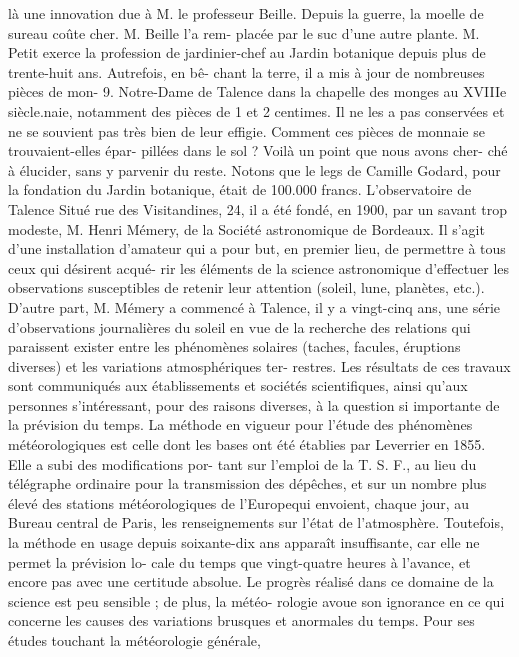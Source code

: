 \documentclass[a4paper,11pt]{book}
\begin{document}
là une innovation due à M. le professeur Beille. Depuis la
guerre, la moelle de sureau coûte cher. M. Beille l'a rem-
placée par le suc d'une autre plante.
M. Petit exerce la profession de jardinier-chef au Jardin
botanique depuis plus de trente-huit ans. Autrefois, en bê-
chant la terre, il a mis à jour de nombreuses pièces de mon-
9. Notre-Dame de Talence dans la chapelle des monges au XVIIIe siècle.naie, notamment des pièces de 1 et 2 centimes. Il ne les a
pas conservées et ne se souvient pas très bien de leur effigie.
Comment ces pièces de monnaie se trouvaient-elles épar-
pillées dans le sol ? Voilà un point que nous avons cher-
ché à élucider, sans y parvenir du reste.
Notons que le legs de Camille Godard, pour la fondation
du Jardin botanique, était de 100.000 francs.
L'observatoire de Talence
Situé rue des Visitandines, 24, il a été fondé, en 1900, par
un savant trop modeste, M. Henri Mémery, de la Société
astronomique de Bordeaux.
Il s'agit d'une installation d'amateur qui a pour but, en
premier lieu, de permettre à tous ceux qui désirent acqué-
rir les éléments de la science astronomique d'effectuer les
observations susceptibles de retenir leur attention (soleil,
lune, planètes, etc.).
D'autre part, M. Mémery a commencé à Talence, il y a
vingt-cinq ans, une série d'observations journalières du
soleil en vue de la recherche des relations qui paraissent
exister entre les phénomènes solaires (taches, facules,
éruptions diverses) et les variations atmosphériques ter-
restres. Les résultats de ces travaux sont communiqués
aux établissements et sociétés scientifiques, ainsi qu'aux
personnes s'intéressant, pour des raisons diverses, à la
question si importante de la prévision du temps.
La méthode en vigueur pour l'étude des phénomènes
météorologiques est celle dont les bases ont été établies
par Leverrier en 1855. Elle a subi des modifications por-
tant sur l'emploi de la T. S. F., au lieu du télégraphe
ordinaire pour la transmission des dépêches, et sur un
nombre plus élevé des stations météorologiques de l'Europequi envoient, chaque jour, au Bureau central de Paris,
les renseignements
sur l'état de l'atmosphère.
Toutefois, la méthode en usage depuis soixante-dix ans
apparaît insuffisante, car elle ne permet la prévision lo-
cale du temps que vingt-quatre heures à l'avance, et encore
pas avec une certitude absolue. Le progrès réalisé dans ce
domaine de la science est peu sensible ; de plus, la météo-
rologie avoue son ignorance en ce qui concerne les causes
des variations brusques et anormales du temps.
Pour ses études touchant la météorologie générale,
\end{document}
